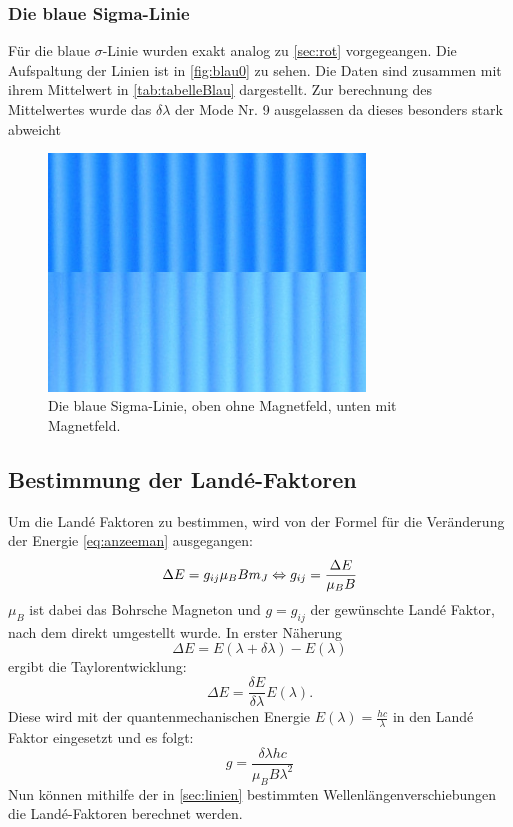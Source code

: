 \subsubsection{Die blaue Sigma-Linie}
Für die blaue $\sigma$-Linie wurden exakt analog zu  \autoref{sec:rot} vorgegeangen. Die Aufspaltung
der Linien ist in \autoref{fig:blau0} zu sehen. Die Daten sind zusammen mit ihrem Mittelwert in \autoref{tab:tabelleBlau}
dargestellt. Zur berechnung des Mittelwertes wurde das $\delta \lambda$ 
der Mode Nr. 9 ausgelassen da dieses besonders stark abweicht
\begin{figure}
  \centering
  \includegraphics[width=0.75\textwidth]{content/grafiken/blau 90.JPG}
  \caption{Die blaue Sigma-Linie, oben ohne Magnetfeld, unten mit Magnetfeld.}
  \label{fig:blau0}
\end{figure}



\FloatBarrier
\subsection{Bestimmung der Landé-Faktoren}
Um die Landé Faktoren zu bestimmen, wird von der Formel für die Veränderung der
Energie \autoref{eq:anzeeman} ausgegangen:
\begin{equation*}
  \Delta E = g_{ij} \mu_B B m_J\\
  \Leftrightarrow g_{ij}=\frac{\Delta E}{\mu_B B} 
\end{equation*}
$\mu_B$ ist dabei das Bohrsche Magneton und $g=g_{ij}$ der gewünschte Landé Faktor, nach
dem direkt umgestellt wurde. In erster Näherung
\begin{equation*}
  \Delta E=E(\lambda+\delta \lambda) - E(\lambda)
\end{equation*}
ergibt die Taylorentwicklung:
\begin{equation*}
  \Delta E=\frac{\delta E}{\delta \lambda} E(\lambda).
\end{equation*}
Diese wird mit der quantenmechanischen Energie $E(\lambda)=\frac{hc}{\lambda }$
in den Landé Faktor eingesetzt und es folgt:
\begin{equation*}
  g=\frac{\delta \lambda hc}{\mu_B B \lambda^2}
\end{equation*}
Nun können mithilfe der in \autoref{sec:linien} bestimmten Wellenlängenverschiebungen die
Landé-Faktoren berechnet werden.


